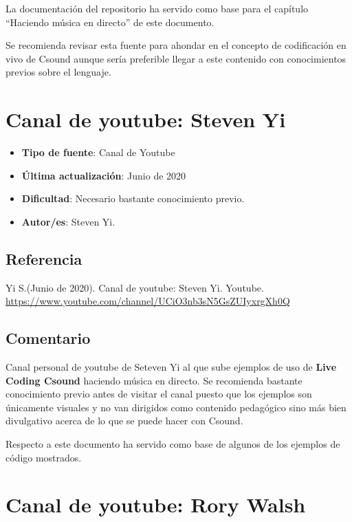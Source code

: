 La documentación del repositorio ha servido como base para el capítulo ``Haciendo música en directo'' de este documento.

Se recomienda revisar esta fuente para ahondar en el concepto de codificación en vivo de Csound aunque sería preferible llegar a este contenido con conocimientos previos sobre el lenguaje.
 
\section{Canal de youtube: Steven Yi}

 \begin{itemize}
 \item \textbf{Tipo de fuente}: Canal de Youtube
 
 \item \textbf{Última actualización}: Junio de 2020
 
 \item \textbf{Dificultad}: Necesario bastante conocimiento previo.
 
 \item \textbf{Autor/es}: Steven Yi.
 \end{itemize}

\subsection{Referencia}

Yi S.(Junio de 2020). Canal de youtube: Steven Yi. Youtube. \url{https://www.youtube.com/channel/UCiO3nb3sN5GsZUIyxrgXh0Q}

\subsection{Comentario}

Canal personal de youtube de Seteven Yi al que sube ejemplos de uso de \textbf{Live Coding Csound} haciendo música en directo. Se recomienda bastante conocimiento previo antes de visitar el canal puesto que los ejemplos son únicamente visuales y no van dirigidos como contenido pedagógico sino más bien divulgativo acerca de lo que se puede hacer con Csound.

Respecto a este documento ha servido como base de algunos de los ejemplos de código mostrados.

\section{Canal de youtube: Rory Walsh}


